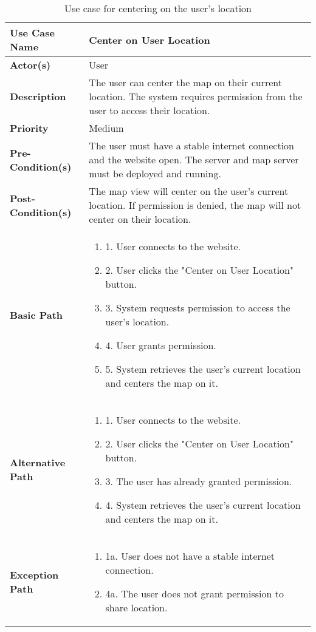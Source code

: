 \begin{table}[h]
    \centering
    \renewcommand{\arraystretch}{1.5}
    \begin{tabularx}{\textwidth}{|l|X|}
        \hline
        \rowcolor{gray!20}
        \textbf{Use Case Name} & Center on User Location \\
        \hline
        \textbf{Actor(s)} & User \\
        \hline
        \textbf{Description} & The user can center the map on their current location. The system requires permission from the user to access their location. \\
        \hline
        \textbf{Priority} & Medium \\
        \hline
        \textbf{Pre-Condition(s)} & The user must have a stable internet connection and the website open. The server and map server must be deployed and running. \\
        \hline
        \textbf{Post-Condition(s)} & The map view will center on the user's current location. If permission is denied, the map will not center on their location. \\
        \hline
        \textbf{Basic Path} &  
        \begin{enumerate}[label=,left=0pt]
            \item 1. User connects to the website.
            \item 2. User clicks the "Center on User Location" button.
            \item 3. System requests permission to access the user's location.
            \item 4. User grants permission.
            \item 5. System retrieves the user's current location and centers the map on it.
        \end{enumerate} \\
        \hline
        \textbf{Alternative Path} & 
        \begin{enumerate}[label=,left=0pt]
            \item 1. User connects to the website.
            \item 2. User clicks the "Center on User Location" button.
            \item 3. The user has already granted permission.
            \item 4. System retrieves the user's current location and centers the map on it.
        \end{enumerate} \\
        \hline
        \textbf{Exception Path} & 
        \begin{enumerate}[label=,left=0pt]
            \item 1a. User does not have a stable internet connection.
            \item 4a. The user does not grant permission to share location.
        \end{enumerate} \\
        \hline
    \end{tabularx}
    \caption*{Use case for centering on the user's location}
    \label{tab:use_case_center_location_appendix}
\end{table}


